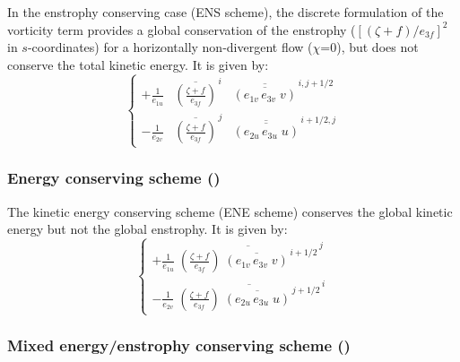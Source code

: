 \documentclass[../main/NEMO_manual]{subfiles}
\begin{document}
In the enstrophy conserving case (ENS scheme),
the discrete formulation of the vorticity term provides a global conservation of the enstrophy
($ [ (\zeta +f ) / e_{3f} ]^2 $ in $s$-coordinates) for a horizontally non-divergent flow (\ie $\chi$=$0$),
but does not conserve the total kinetic energy.
It is given by:
\begin{equation}
  \label{eq:dynvor_ens}
  \left\{
    \begin{aligned}
      {+\frac{1}{e_{1u} } } & {\overline {\left( { \frac{\zeta +f}{e_{3f} }} \right)} }^{\,i}
      & {\overline{\overline {\left( {e_{1v}\,e_{3v}\;v} \right)}} }^{\,i, j+1/2}    \\
      {- \frac{1}{e_{2v} } } & {\overline {\left( {\frac{\zeta +f}{e_{3f} }} \right)} }^{\,j}
      & {\overline{\overline {\left( {e_{2u}\,e_{3u}\;u} \right)}} }^{\,i+1/2, j}
    \end{aligned}
  \right.
\end{equation} 

\subsubsection{Energy conserving scheme (\protect{})}
\label{subsec:DYN_vor_ene}

The kinetic energy conserving scheme (ENE scheme) conserves the global kinetic energy but not the global enstrophy.
It is given by:
\begin{equation}
  \label{eq:dynvor_ene}
  \left\{
    \begin{aligned}
      {+\frac{1}{e_{1u}}\; {\overline {\left( {\frac{\zeta +f}{e_{3f} }} \right)
            \;  \overline {\left( {e_{1v}\,e_{3v}\;v} \right)} ^{\,i+1/2}} }^{\,j} }    \\
      {- \frac{1}{e_{2v}}\; {\overline {\left( {\frac{\zeta +f}{e_{3f} }} \right)
            \;  \overline {\left( {e_{2u}\,e_{3u}\;u} \right)} ^{\,j+1/2}} }^{\,i} }
    \end{aligned}
  \right.
\end{equation} 

\subsubsection{Mixed energy/enstrophy conserving scheme (\protect{}) }
\label{subsec:DYN_vor_mix}
\end{document}
